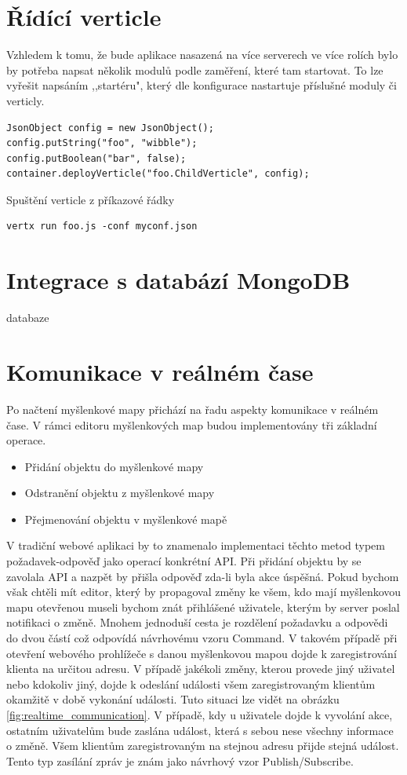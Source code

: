 \section{Řídící verticle}

Vzhledem k tomu, že bude aplikace nasazená na více serverech ve více rolích bylo by potřeba napsat několik modulů podle zaměření, které tam startovat. To lze vyřešit napsáním ,,startéru", který dle konfigurace nastartuje příslušné moduly či verticly.

\begin{lstlisting}
JsonObject config = new JsonObject();
config.putString("foo", "wibble");
config.putBoolean("bar", false);
container.deployVerticle("foo.ChildVerticle", config);
\end{lstlisting}

Spuštění verticle z příkazové řádky
\begin{lstlisting}
vertx run foo.js -conf myconf.json
\end{lstlisting}

\section{Integrace s databází MongoDB}

databaze

\section{Komunikace v reálném čase}\label{sec:realTimeCommunication}

Po načtení myšlenkové mapy přichází na řadu aspekty komunikace v reálném čase. V rámci editoru myšlenkových map budou implementovány tři základní operace.
\begin{itemize}
\item Přidání objektu do myšlenkové mapy
\item Odstranění objektu z myšlenkové mapy
\item Přejmenování objektu v myšlenkové mapě
\end{itemize}
V tradiční webové aplikaci by to znamenalo implementaci těchto metod typem požadavek-odpověď jako operací konkrétní API. Při přidání objektu by se zavolala API a nazpět by přišla odpověď zda-li byla akce úspěšná. Pokud bychom však chtěli mít editor, který by propagoval změny ke všem, kdo mají myšlenkovou mapu otevřenou museli bychom znát přihlášené uživatele, kterým by server poslal notifikaci o změně. Mnohem jednoduší cesta je rozdělení požadavku a odpovědi do dvou částí což odpovídá návrhovému vzoru Command. V takovém případě při otevření webového prohlížeče s danou myšlenkovou mapou dojde k zaregistrování klienta na určitou adresu. V případě jakékoli změny, kterou provede jiný uživatel nebo kdokoliv jiný, dojde k odeslání události všem zaregistrovaným klientům okamžitě v době vykonání události. Tuto situaci lze vidět na obrázku \ref{fig:realtime_communication}. V případě, kdy u uživatele dojde k vyvolání akce, ostatním uživatelům bude zaslána událost, která s sebou nese všechny informace o změně. Všem klientům zaregistrovaným na stejnou adresu přijde stejná událost. Tento typ zasílání zpráv je znám jako návrhový vzor Publish/Subscribe.

